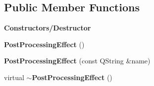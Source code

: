 \subsection*{Public Member Functions}
\begin{Indent}\textbf{ Constructors/\+Destructor}\par
\begin{DoxyCompactItemize}
\item 
\mbox{\label{classrev_1_1_post_processing_effect_aa6651b75c8eb2e601c8863004ceece46}} 
{\bfseries Post\+Processing\+Effect} ()
\item 
\mbox{\label{classrev_1_1_post_processing_effect_ad352f87dd78810cfbf88044020e99be7}} 
{\bfseries Post\+Processing\+Effect} (const Q\+String \&name)
\item 
\mbox{\label{classrev_1_1_post_processing_effect_a2f5a8a25ec8268ee6f39b21620a90b60}} 
virtual {\bfseries $\sim$\+Post\+Processing\+Effect} ()
\end{DoxyCompactItemize}
\end{Indent}
